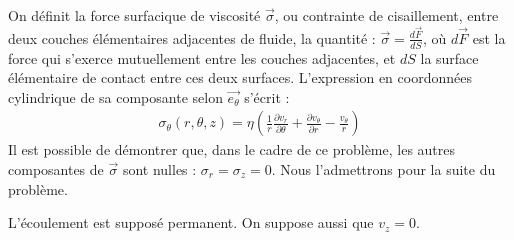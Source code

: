 \documentclass{report}
\begin{document}
On définit la force surfacique de viscosité $\vec{\sigma}$, ou contrainte de cisaillement, entre deux couches élémentaires adjacentes de fluide, la quantité : $\vec{\sigma}=\frac{d\vec{F}}{dS}$,
où $d\vec{F}$ est la force qui s'exerce mutuellement entre les couches adjacentes, et $dS$ la surface élémentaire de contact entre ces deux surfaces. L'expression en coordonnées cylindrique de sa composante selon $\vec{e_\theta}$ s'écrit : 
\begin{align*}
	\sigma_\theta(r,\theta,z)=\eta\left(\frac{1}{r}\frac{\partial v_r}{\partial \theta}+ \frac{\partial v_\theta}{\partial r} - \frac{v_\theta}{r} \right)
\end{align*}
Il est possible de démontrer que, dans le cadre de ce problème, les autres composantes de $\vec{\sigma}$ sont nulles : $\sigma_r=\sigma_z=0$. Nous l'admettrons pour la suite du problème. 

L'écoulement est supposé permanent. On suppose aussi que $v_z=0$.
\end{document}
